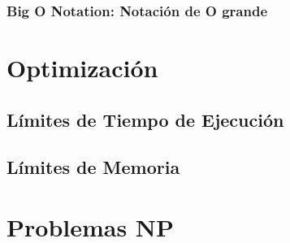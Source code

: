 \documentclass[12pt, fleqn]{report}                             %
\theoremstyle{break}                                            %
\begin{document}
            \subsection{Big O Notation: Notación de O grande}



    \clearpage
    \chapter{Optimización}

        \section{Límites de Tiempo de Ejecución}

        \section{Límites de Memoria}



    \clearpage
    \chapter{Problemas NP}


\end{document}

